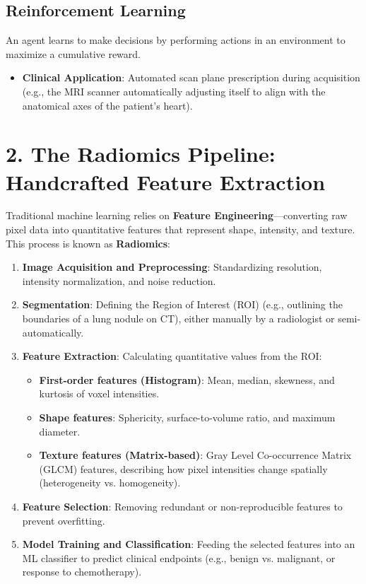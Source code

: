 \subsection*{Reinforcement Learning}
An agent learns to make decisions by performing actions in an environment to maximize a cumulative reward.
\begin{itemize}
    \item \textbf{Clinical Application}: Automated scan plane prescription during acquisition (e.g., the MRI scanner automatically adjusting itself to align with the anatomical axes of the patient's heart).
\end{itemize}


\section*{2. The Radiomics Pipeline: Handcrafted Feature Extraction}
Traditional machine learning relies on \textbf{Feature Engineering}—converting raw pixel data into quantitative features that represent shape, intensity, and texture. This process is known as \textbf{Radiomics}:

\begin{enumerate}
    \item \textbf{Image Acquisition and Preprocessing}: Standardizing resolution, intensity normalization, and noise reduction.
    \item \textbf{Segmentation}: Defining the Region of Interest (ROI) (e.g., outlining the boundaries of a lung nodule on CT), either manually by a radiologist or semi-automatically.
    \item \textbf{Feature Extraction}: Calculating quantitative values from the ROI:
    \begin{itemize}
        \item \textbf{First-order features (Histogram)}: Mean, median, skewness, and kurtosis of voxel intensities.
        \item \textbf{Shape features}: Sphericity, surface-to-volume ratio, and maximum diameter.
        \item \textbf{Texture features (Matrix-based)}: Gray Level Co-occurrence Matrix (GLCM) features, describing how pixel intensities change spatially (heterogeneity vs. homogeneity).
    \end{itemize}
    \item \textbf{Feature Selection}: Removing redundant or non-reproducible features to prevent overfitting.
    \item \textbf{Model Training and Classification}: Feeding the selected features into an ML classifier to predict clinical endpoints (e.g., benign vs. malignant, or response to chemotherapy).
\end{enumerate}


